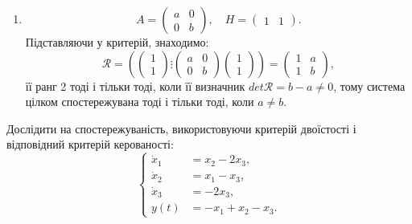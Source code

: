 \begin{solution}
\begin{enumerate}
    	\item \[ A = \begin{pmatrix} a & 0 \\ 0 & b \end{pmatrix}, \quad H = \begin{pmatrix} 1 & 1 \end{pmatrix}. \] Підставляючи у критерій, знаходимо: \[ \mathcal{R} = \left(\begin{pmatrix} 1 \\ 1 \end{pmatrix} \vdots \begin{pmatrix} a & 0 \\ 0 & b \end{pmatrix} \begin{pmatrix} 1 \\ 1 \end{pmatrix}\right) = \begin{pmatrix} 1 & a \\ 1 & b \end{pmatrix}, \] її ранг 2 тоді і тільки тоді, коли її визначник $det \mathcal{R} = b - a \ne 0$, тому система цілком спостережувана тоді і тільки тоді, коли $a \ne b$.
    \end{enumerate}
\end{solution}

\begin{problem}
    Дослідити на спостережуваність, використовуючи критерій двоїстості і відповідний критерій керованості: \[ \left\{ \begin{aligned}
    	\dot x_1 &= x_2 - 2 x_3, \\
    	\dot x_2 &= x_1 - x_3, \\
    	\dot x_3 &= - 2 x_3, \\
    	y(t) &= -x_1 + x_2 - x_3.
    \end{aligned} \right. \]
\end{problem}

